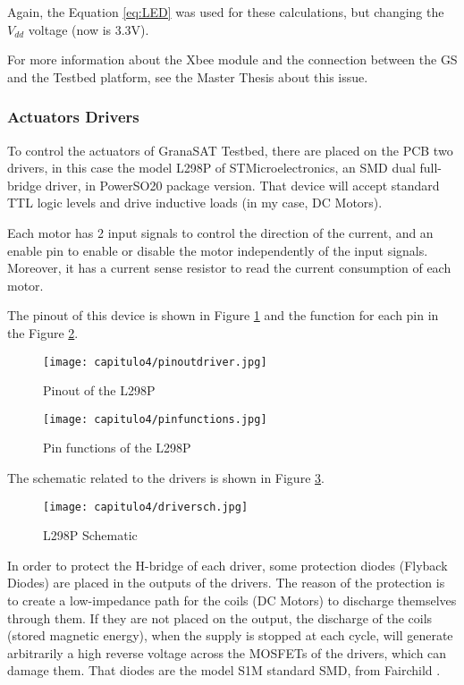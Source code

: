 Again, the Equation \ref{eq:LED} was used for these calculations, but changing the $ V_{dd}$ voltage (now is 3.3V).

For more information about the Xbee module and the connection between the \acrshort{GS} and the Testbed platform, see the Master Thesis about this issue. \cite{carlos}

\subsubsection{Actuators Drivers} \label{sssec:drivers}

To control the actuators of \gls{GranaSAT} Testbed, there are placed on the \acrshort{PCB} two drivers, in this case the model L298P of STMicroelectronics, an \acrshort{SMD} dual full-bridge driver, in PowerSO20 package version. That device will accept standard TTL logic levels and drive inductive loads (in my case, DC Motors).\cite{L298P}

Each motor has 2 input signals to control the direction of the current, and an enable pin to enable or disable the motor independently of the input signals. Moreover, it has a current sense resistor to read the current consumption of each motor.

The pinout of this device is shown in Figure \ref{fig:pinoutdriver} and the function for each pin in the Figure \ref{fig:pinfunction}.

\begin{figure}[H]
	\centering
		\texttt{[image: capitulo4/pinoutdriver.jpg]}
	\caption{Pinout of the L298P \cite{L298P}}
	\label{fig:pinoutdriver}
\end{figure}

\begin{figure}[H]
	\centering
		\texttt{[image: capitulo4/pinfunctions.jpg]}
	\caption{Pin functions of the L298P \cite{L298P}}
	\label{fig:pinfunction}
\end{figure}

The schematic related to the drivers is shown in Figure \ref{fig:driversch}.

\begin{figure}[H]
	\centering
		\texttt{[image: capitulo4/driversch.jpg]}
	\caption{L298P Schematic \cite{L298P}}
	\label{fig:driversch}
\end{figure}

In order to protect the H-bridge of each driver, some protection diodes (Flyback Diodes) are placed in the outputs of the drivers. The reason of the protection is to create a low-impedance path for the coils (DC Motors) to discharge themselves through them. If they are not placed on the output, the discharge of the coils (stored magnetic energy), when the supply is stopped at each cycle, will generate arbitrarily a high reverse voltage across the \acrshort{MOSFET}s of the drivers, which can damage them. That diodes are the model S1M standard \acrshort{SMD}, from Fairchild \cite{S1M}.

